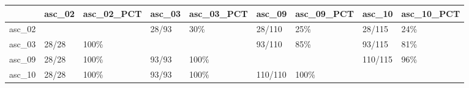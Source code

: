 \begin{tabular}{lllllllll}
\toprule
{} & asc\_02 & asc\_02\_PCT & asc\_03 & asc\_03\_PCT &   asc\_09 & asc\_09\_PCT &   asc\_10 & asc\_10\_PCT \\
\midrule
asc\_02 &        &            &  28/93 &        30\% &   28/110 &        25\% &   28/115 &        24\% \\
asc\_03 &  28/28 &       100\% &        &            &   93/110 &        85\% &   93/115 &        81\% \\
asc\_09 &  28/28 &       100\% &  93/93 &       100\% &          &            &  110/115 &        96\% \\
asc\_10 &  28/28 &       100\% &  93/93 &       100\% &  110/110 &       100\% &          &            \\
\bottomrule
\end{tabular}
